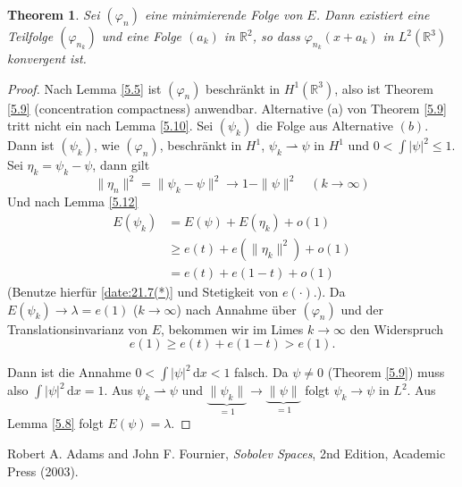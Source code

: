 \documentclass[
paper=a4,
bibtotocnumbered,
liststotocnumbered,
tablecaptionabove,
pointlessnumbers,
twoside,
openright,
10pt
]
{report}
\let\phi\varphi
\newtheorem{thm}{Theorem}[chapter]
\theoremstyle{definition}
\numberwithin{equation}{chapter}
\begin{document}
\begin{thm}\label{5.13}
Sei $(\phi_n)$ eine minimierende Folge von $E$. Dann existiert eine Teilfolge $(\phi_{n_k})$ und eine Folge $(a_k)$ in $\mathbb R^2$, so dass $\phi_{n_k} (x+a_k)$ in $L^2(\mathbb R^3)$ konvergent ist.  
\end{thm}
\begin{proof}
Nach Lemma \ref{5.5} ist $(\phi_n)$ beschränkt in $H^1(\mathbb R^3)$, also ist Theorem \ref{5.9} (concentration compactness) anwendbar. Alternative (a) von Theorem \ref{5.9} tritt nicht ein nach Lemma \ref{5.10}. Sei $(\psi_k)$ die Folge aus Alternative $(b)$. Dann ist $(\psi_k)$, wie $(\phi_n)$, beschränkt in $H^1$, $\psi_k \rightharpoonup \psi$ in $H^1$ und $0 < \int |\psi|^2\le 1$. Sei $\eta_k = \psi_k - \psi$, dann gilt
\begin{equation}\label{date:21.7(*)}
\| \eta_n \|^2 = \|\psi_k - \psi\|^2 \to 1- \| \psi\|^2 \quad (k\to \infty)
\end{equation}
Und nach Lemma \ref{5.12} 
\begin{align}
E(\psi_k) &= E(\psi) + E(\eta_k) + o(1)\\
&\ge e(t) + e(\| \eta_k\|^2) + o(1)\\
&= e(t) + e(1-t) + o(1)
\end{align}
(Benutze hierfür \eqref{date:21.7(*)} und Stetigkeit von $e(\cdot)$.). Da $E(\psi_k) \to \lambda = e(1)$ ($k\to \infty$) nach Annahme über $(\phi_n)$ und der Translationsinvarianz von $E$, bekommen wir im Limes $k\to \infty$ den Widerspruch $$e(1)\ge e(t) + e(1-t) > e(1).$$

Dann ist die Annahme $0 < \int |\psi|^2 \, \mathrm dx <1$ falsch. Da $\psi \neq 0$ (Theorem \ref{5.9}) muss also $\int |\psi|^2 \, \mathrm dx =1$. Aus $\psi_k \rightharpoonup \psi$ und $\underbrace{\|\psi_k \|}_{=1} \to \underbrace{\| \psi\|}_{=1}$ folgt $\psi_k \to \psi$ in $L^2$.  Aus Lemma \ref{5.8} folgt $E(\psi)=\lambda$.
\end{proof}
\begin{thebibliography}{xxx}
 Robert A. Adams and John F.  Fournier, \textit{Sobolev Spaces}, 2nd Edition, Academic Press (2003).
\end{thebibliography}
\end{document}
